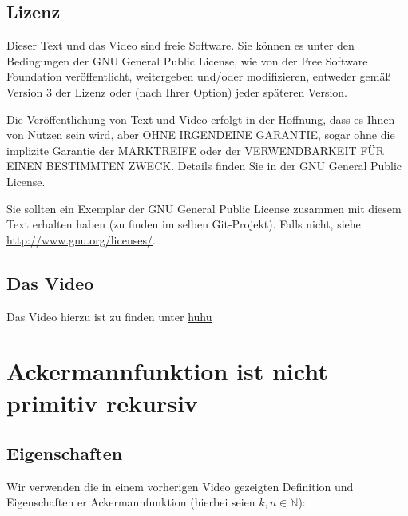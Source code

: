 \documentclass[a4paper]{amsart}
\theoremstyle{definition}
\newcommand{\N}{\ensuremath{\mathbb{ N }}}
\begin{document}
\subsection*{Lizenz}
Dieser Text und das Video sind freie Software. Sie können es unter den Bedingungen der 
GNU General Public License, wie von der Free Software Foundation veröffentlicht, weitergeben 
und/oder modifizieren, entweder gemäß Version 3 der Lizenz oder (nach Ihrer Option) jeder späteren Version.

Die Veröffentlichung von Text und Video erfolgt in der Hoffnung, dass es Ihnen von Nutzen sein wird, 
aber OHNE IRGENDEINE GARANTIE, sogar ohne die implizite Garantie der MARKTREIFE oder der 
VERWENDBARKEIT FÜR EINEN BESTIMMTEN ZWECK. Details finden Sie in der GNU General Public License.

Sie sollten ein Exemplar der GNU General Public License zusammen mit diesem Text erhalten haben 
(zu finden im selben Git-Projekt). 
Falls nicht, siehe \url{http://www.gnu.org/licenses/}.

\subsection*{Das Video}
Das Video hierzu ist zu finden unter 
{\tiny
	\url{huhu}
}

\section{Ackermannfunktion ist nicht primitiv rekursiv}

\subsection{Eigenschaften}
Wir verwenden die in einem vorherigen Video gezeigten Definition und Eigenschaften er Ackermannfunktion
(hierbei seien $k, n \in \N$):
\end{document}
